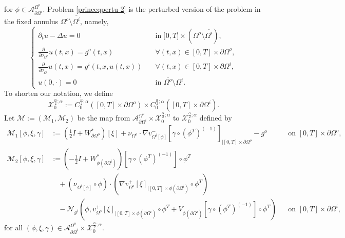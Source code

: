 \documentclass[11pt,reqno,a4paper]{amsart}
\theoremstyle{plain}
\theoremstyle{definition}
\begin{document}
for $\phi \in \mathcal{A}^{\Omega^o}_{\partial\Omega^i}$. Problem \eqref{princeqpertu 2} is the perturbed version of the problem in the fixed annulus $\Omega^o \setminus \overline{\Omega^i}$, namely,
\begin{equation}\label{princeq 2}
\begin{cases}
    \partial_t u - \Delta u = 0 & \quad\text{in } ]0,T] \times (\Omega^o \setminus \overline{\Omega^i}), 
    \\
    \frac{\partial}{\partial\nu_{\Omega^o}} u(t,x) = g^o(t,x)& \quad \forall (t,x)\in [0,T] \times \partial \Omega^o, 
    \\
    \frac{\partial}{\partial\nu_{\Omega^i}} u (t,x) = g^i(t,x,u(t,x)) & \quad \forall (t,x)\in  [0,T] \times \partial \Omega^i,
    \\
    u(0,\cdot)=0 & \quad \text{in } \overline{\Omega^o} \setminus \Omega^i.
    \end{cases}
\end{equation}
To shorten our notation, we define 
\[
\mathcal{X}_0^{\frac{\alpha}{2}; \alpha} :=  C_0^{\frac{\alpha}{2}; \alpha}([0,T] \times \partial\Omega^o) \times C_0^{\frac{\alpha}{2}; \alpha}([0,T] \times \partial \Omega^i).
\]
Let $\mathcal{M}:=(\mathcal{M}_1,\mathcal{M}_2)$ be the map from $\mathcal{A}^{\Omega^o}_{\partial\Omega^i}\times\mathcal{X}_0^{\frac\alpha2;\alpha}$ to $\mathcal{X}_0^{\frac\alpha2;\alpha}$ defined by
\begin{equation}\label{eq M Robin}
\begin{aligned}
\mathcal{M}_1[\phi,\xi,\gamma]
&:=\left(\frac12I+W_{\partial\Omega^o}^*\right)[\xi]
+\nu_{\Omega^o}\cdot\nabla v^-_{\Omega^i[\phi]}
\left[\gamma\circ(\phi^T)^{(-1)}\right]_{|[0,T]\times\partial\Omega^o}
-g^o
&&\text{on }[0,T]\times\partial\Omega^o,
\\
\mathcal{M}_2[\phi,\xi,\gamma]
&:=\left(-\frac12I+W_{\phi(\partial\Omega^i)}^*\right)
\left[\gamma\circ(\phi^T)^{(-1)}\right]\circ\phi^T
\\
&\quad +(\nu_{\Omega^i[\phi]}\circ\phi)\cdot
\left(\nabla v^+_{\Omega^o}[\xi]_{|[0,T]\times\phi(\partial\Omega^i)}\circ\phi^T\right)
\\
&\quad -\mathcal{N}_{g^i} \left( \phi, v^+_{\Omega^o}[\xi]_{|[0,T]\times\phi(\partial\Omega^i)}\circ\phi^T + V_{\phi(\partial\Omega^i)} \left[\gamma\circ(\phi^T)^{(-1)}\right]\circ\phi^T \right)
&&\text{on }[0,T]\times\partial\Omega^i,
\end{aligned}
\end{equation}
for all $(\phi,\xi,\gamma)\in\mathcal{A}^{\Omega^o}_{\partial\Omega^i}\times\mathcal{X}_0^{\frac\alpha2;\alpha}$.
\end{document}
